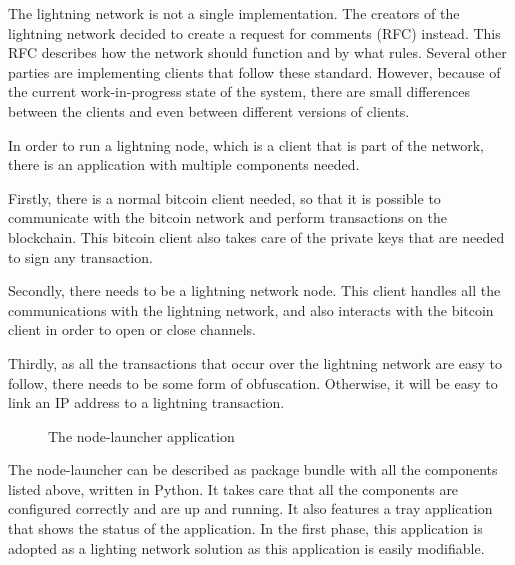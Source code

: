 The lightning network is not a single implementation. The creators of the lightning network decided to create a request for comments (RFC) instead. This RFC describes how the network should function and by what rules. Several other parties are implementing clients that follow these standard. However, because of the current work-in-progress state of the system, there are small differences between the clients and even between different versions of clients. 

In order to run a lightning node, which is a client that is part of the network, there is an application with multiple components needed. 

Firstly, there is a normal bitcoin client needed, so that it is possible to communicate with the bitcoin network and perform transactions on the blockchain. This bitcoin client also takes care of the private keys that are needed to sign any transaction.

Secondly, there needs to be a lightning network node. This client handles all the communications with the lightning network, and also interacts with the bitcoin client in order to open or close channels. 

Thirdly, as all the transactions that occur over the lightning network are easy to follow, there needs to be some form of obfuscation. Otherwise, it will be easy to link an IP address to a lightning transaction.

\begin{figure}[h!]
  \setlength{\fboxsep}{0pt}%
  \center
  \caption{The node-launcher application}
\end{figure}

The node-launcher can be described as package bundle with all the components listed above, written in Python. It takes care that all the components are configured correctly and are up and running. It also features a tray application that shows the status of the application. In the first phase, this application is adopted as a lighting network solution as this application is easily modifiable.

